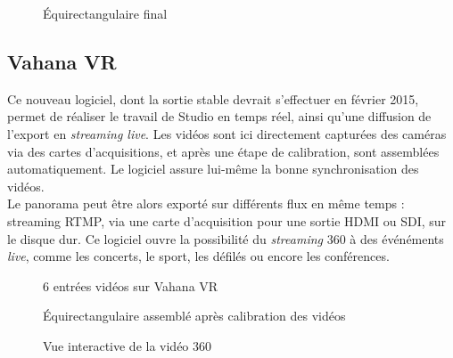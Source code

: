 \begin{figure}
  \centering
  \caption{Équirectangulaire final} 
\end{figure}

\subsection{Vahana VR}
\label{vahana-vr-section}
Ce nouveau logiciel, dont la sortie stable devrait s'effectuer en février 2015,
permet de réaliser le travail de Studio en temps réel, ainsi qu'une diffusion
de l'export en \textit{streaming live}. Les vidéos sont ici directement capturées des
caméras via des cartes d'acquisitions, et après une étape de calibration, sont
assemblées automatiquement. Le logiciel assure lui-même la bonne synchronisation
des vidéos.\\
Le panorama peut être alors exporté sur différents flux en même temps : 
streaming RTMP, via une carte d'acquisition pour une sortie HDMI ou SDI, sur le
disque dur. Ce logiciel ouvre la possibilité du \textit{streaming} 360 à des événéments 
\textit{live}, comme les concerts, le sport, les défilés ou encore les conférences.
\begin{figure}
  \centering
  \begin{minipage}{0.3\textwidth}
    \centering
    \caption{6 entrées vidéos sur Vahana VR}
  \end{minipage}%
  \begin{minipage}{0.3\textwidth}
    \centering
    \caption{Équirectangulaire assemblé après calibration des vidéos}
  \end{minipage}
  \begin{minipage}{0.3\textwidth}
    \centering
    \caption{Vue interactive de la vidéo 360}
  \end{minipage}
\end{figure}

